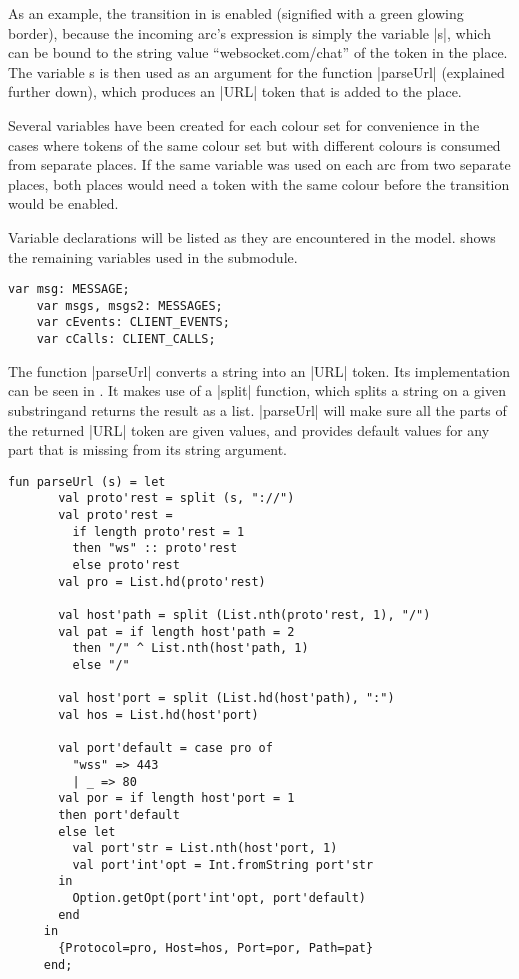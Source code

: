 	As an example, the  transition in  is
	enabled (signified with a green glowing border), because the incoming arc's
	expression is simply the variable |s|, which can be bound to the string value
	``websocket.com/chat'' of the token in the  place. The variable
	s is then used as an argument for the function |parseUrl| (explained further
	down), which produces an |URL| token that is added to the  place.
	
	Several variables have been created for each colour set for convenience in
	the cases where tokens of the same colour set but with different colours is
	consumed from separate places. If the same variable was used on each arc from
	two separate places, both places would need a token with the same colour
	before the transition would be enabled. 
	
	Variable declarations will be listed as they are encountered in the
	model.  shows the remaining variables used in the
	 submodule.
	
	\begin{lstlisting}[label=lst:client_app_vars,caption=Client Application
	Variables,gobble=1]
	var msg: MESSAGE;
	var msgs, msgs2: MESSAGES;
	var cEvents: CLIENT_EVENTS;
	var cCalls: CLIENT_CALLS;
	\end{lstlisting}
	
	The function |parseUrl| converts a string into an |URL| token. Its
	implementation can be seen in . It makes use of a
	|split| function, which splits a string on a given substringand returns the
	result as a list. |parseUrl| will make sure all the parts of the returned |URL|
	token are given values, and provides default values for any part that is
	missing from its string argument. 
	
	\begin{lstlisting}[label=lst:client_app_parseUrl,caption=The parseUrl function,gobble=1,float] 
	 fun parseUrl (s) = let
	   val proto'rest = split (s, "://")
	   val proto'rest = 
	     if length proto'rest = 1 
	     then "ws" :: proto'rest 
	     else proto'rest 
	   val pro = List.hd(proto'rest)
	 
	   val host'path = split (List.nth(proto'rest, 1), "/")
	   val pat = if length host'path = 2
	     then "/" ^ List.nth(host'path, 1)
	     else "/"
	   
	   val host'port = split (List.hd(host'path), ":")
	   val hos = List.hd(host'port)
	 
	   val port'default = case pro of
	     "wss" => 443
	     | _ => 80
	   val por = if length host'port = 1 
	   then port'default
	   else let
	     val port'str = List.nth(host'port, 1)
	     val port'int'opt = Int.fromString port'str
	   in
	     Option.getOpt(port'int'opt, port'default)
	   end
	 in
	   {Protocol=pro, Host=hos, Port=por, Path=pat}
	 end;
	\end{lstlisting}
	
